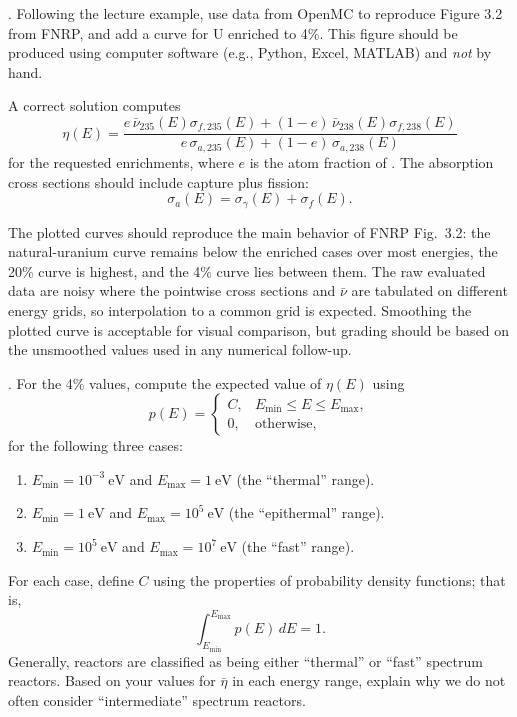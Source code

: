 
. Following the lecture example, use data from OpenMC
to reproduce Figure 3.2 from FNRP, and add a curve for U enriched to 4\%.
This figure should be produced using computer software (e.g., Python, Excel,
MATLAB) and {\it not} by hand.

\begin{adaptedsolution}
A correct solution computes
\[
 \eta(E)=
 \frac{e\,\bar{\nu}_{235}(E)\sigma_{f,235}(E)
       +(1-e)\,\bar{\nu}_{238}(E)\sigma_{f,238}(E)}
      {e\,\sigma_{a,235}(E)+(1-e)\,\sigma_{a,238}(E)}
\]
for the requested enrichments, where $e$ is the atom fraction of
.  The absorption cross sections should include capture plus
fission:
\[
 \sigma_a(E)=\sigma_\gamma(E)+\sigma_f(E).
\]

The plotted curves should reproduce the main behavior of FNRP Fig.~3.2: the
natural-uranium curve remains below the enriched cases over most energies, the
20\% curve is highest, and the 4\% curve lies between them.  The raw evaluated
data are noisy where the pointwise cross sections and $\bar{\nu}$ are tabulated
on different energy grids, so interpolation to a common grid is expected.
Smoothing the plotted curve is acceptable for visual comparison, but grading
should be based on the unsmoothed values used in any numerical follow-up.
\end{adaptedsolution}

\newpage

. For the 4\% values, compute the expected value of
$\eta(E)$ using
\[
p(E)=
  \begin{cases}
    C, & E_{\mathrm{min}}\le E\le E_{\mathrm{max}},\\
    0, & \text{otherwise},
  \end{cases}
\]
for the following three cases:
\begin{enumerate}[label=(\alph*)]
\item $E_{\mathrm{min}}=10^{-3}~\mathrm{eV}$ and
      $E_{\mathrm{max}}=1~\mathrm{eV}$ (the ``thermal'' range).
\item $E_{\mathrm{min}}=1~\mathrm{eV}$ and
      $E_{\mathrm{max}}=10^5~\mathrm{eV}$ (the ``epithermal'' range).
\item $E_{\mathrm{min}}=10^5~\mathrm{eV}$ and
      $E_{\mathrm{max}}=10^7~\mathrm{eV}$ (the ``fast'' range).
\end{enumerate}
For each case, define $C$ using the properties of probability density
functions; that is,
\[
 \int_{E_{\mathrm{min}}}^{E_{\mathrm{max}}}p(E)\,dE=1.
\]
Generally, reactors are classified as being either ``thermal'' or ``fast''
spectrum reactors. Based on your values for $\bar{\eta}$ in each energy range,
explain why we do not often consider ``intermediate'' spectrum reactors.

